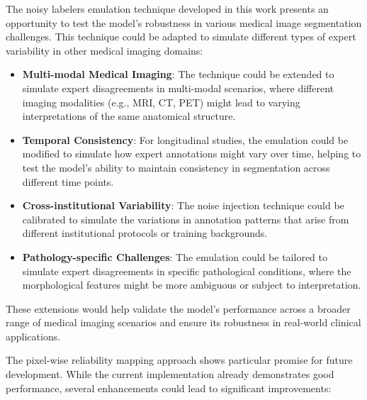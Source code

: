 The noisy labelers emulation technique developed in this work presents
an opportunity to test the model's robustness in various medical image
segmentation challenges. This technique could be adapted to simulate
different types of expert variability in other medical imaging domains:

\begin{itemize}
  \item \textbf{Multi-modal Medical Imaging}: The technique could be
    extended to simulate expert disagreements in multi-modal scenarios,
    where different imaging modalities (e.g., MRI, CT, PET) might lead
    to varying interpretations of the same anatomical structure.
  \item \textbf{Temporal Consistency}: For longitudinal studies, the
    emulation could be modified to simulate how expert annotations
    might vary over time, helping to test the model's ability to
    maintain consistency in segmentation across different time points.
  \item \textbf{Cross-institutional Variability}: The noise injection
    technique could be calibrated to simulate the variations in
    annotation patterns that arise from different institutional
    protocols or training backgrounds.
  \item \textbf{Pathology-specific Challenges}: The emulation could be
    tailored to simulate expert disagreements in specific pathological
    conditions, where the morphological features might be more
    ambiguous or subject to interpretation.
\end{itemize}

These extensions would help validate the model's performance across a
broader range of medical imaging scenarios and ensure its robustness
in real-world clinical applications.

The pixel-wise reliability mapping approach shows particular promise
for future development. While the current implementation already
demonstrates good performance, several enhancements could lead to
significant improvements:

